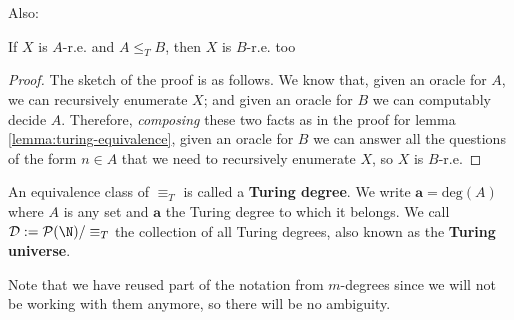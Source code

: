 \documentclass[../main.tex]{memoir}
\begin{document}
Also:

\begin{lemma}
  \label{lemma:re-monotonicity}
  If $X$ is $A$-r.e. and $A \le_T B$, then $X$ is $B$-r.e. too
\end{lemma}
\begin{proof}
  The sketch of the proof is as follows. We know that, given an oracle for $A$, we can recursively enumerate $X$; and given an oracle for $B$ we can computably decide $A$. Therefore, \textit{composing} these two facts as in the proof for lemma \ref{lemma:turing-equivalence}, given an oracle for $B$ we can answer all the questions of the form $n \in A$ that we need to recursively enumerate $X$, so $X$ is $B$-r.e.
\end{proof}

\begin{definition}
  \label{def:turing-degree}
  An equivalence class of $\equiv_T$ is called a \textbf{Turing degree}. We write $\mathbf{a} = \text{deg}(A)$ where $A$ is any set and $\mathbf{a}$ the Turing degree to which it belongs. We call $\mathbf{\mathcal{D}} := \mathcal{P}(\N) / \equiv_T$ the collection of all Turing degrees, also known as the \textbf{Turing universe}.
\end{definition}

\begin{remark}
  Note that we have reused part of the notation from $m$-degrees since we will not be working with them anymore, so there will be no ambiguity.
\end{remark}
\end{document}

